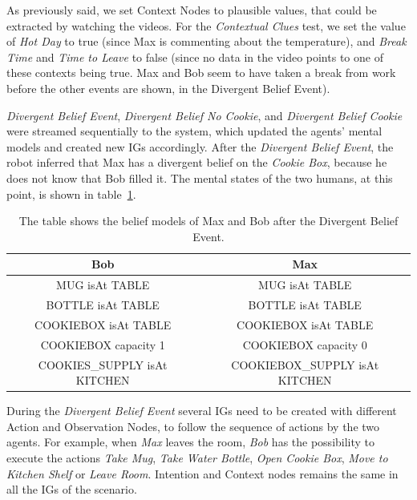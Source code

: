 As previously said, we set Context Nodes to plausible values, that could be extracted by watching the videos. For the \textit{Contextual Clues} test, we set the value of \textit{Hot Day} to true (since Max is commenting about the temperature), and \textit{Break Time} and \textit{Time to Leave} to false (since no data in the video points to one of these contexts being true. Max and Bob seem to have taken a break from work before the other events are shown, in the Divergent Belief Event).

\textit{Divergent Belief Event}, \textit{Divergent Belief No Cookie}, and \textit{Divergent Belief Cookie} were streamed sequentially to the system, which updated the agents' mental models and created new IGs accordingly.
After the \textit{Divergent Belief Event}, the robot inferred that Max has a divergent belief on the \textit{Cookie Box}, because he does not know that Bob filled it. The mental states of the two humans, at this point, is shown in table~\ref{table:observer_results-divergent_event}.


\begin{table}[h!]
\centering
\scriptsize
\renewcommand{\arraystretch}{1.3}
\begin{tabular}{|c|c|}
\hline
Bob & Max \\ \hline \hline
MUG isAt TABLE   & MUG isAt TABLE \\ \hline
BOTTLE isAt TABLE  & BOTTLE isAt TABLE \\ \hline
COOKIEBOX isAt TABLE   & COOKIEBOX isAt TABLE \\ \hline
COOKIEBOX capacity 1  & COOKIEBOX capacity 0   \\ \hline
COOKIES\_SUPPLY isAt KITCHEN & COOKIEBOX\_SUPPLY isAt KITCHEN  \\ \hline
\end{tabular}
\caption[Belief models of Max And Bob after the Divergent Belief Event]{The table shows the belief models of Max and Bob after the Divergent Belief Event. } 
 \label{table:observer_results-divergent_event}    
\end{table}



 During the \textit{Divergent Belief Event} several IGs need to be created with different Action and Observation Nodes, to follow the sequence of actions by the two agents. For example, when \textit{Max} leaves the room, \textit{Bob} has the possibility to execute the actions \textit{Take Mug}, \textit{Take Water Bottle}, \textit{Open Cookie Box}, \textit{Move to Kitchen Shelf} or \textit{Leave Room}. Intention and Context nodes remains the same in all the IGs of the scenario.



